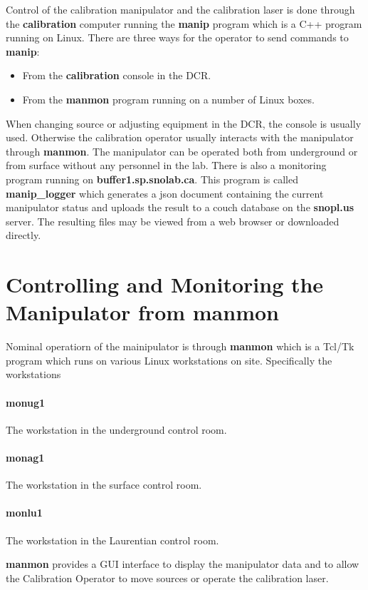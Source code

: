 
Control of the calibration manipulator and the calibration laser is
done through the \textbf{calibration} computer running the \textbf{manip}
program which is a C++ program running on Linux. There are three ways
for the operator to send commands to \textbf{manip}:
\begin{itemize}
\item From the \textbf{calibration} console in the DCR.
\item From the \textbf{manmon} program running on a number of Linux
  boxes.
\end{itemize}
When changing source or adjusting equipment in the DCR, the console is
usually used. Otherwise the calibration operator usually interacts
with the manipulator through \textbf{manmon}. The manipulator can be
operated both from underground or from surface without any personnel
in the lab. There is also a monitoring program running on
\textbf{buffer1.sp.snolab.ca}. This program is called
\textbf{manip\_logger} which generates a json document containing the
current manipulator status and uploads the result to a couch database
on the \textbf{snopl.us} server. The resulting files may be viewed
from a web browser or downloaded directly.

\section{Controlling and Monitoring the Manipulator from manmon}
Nominal operatiorn of the mainipulator is through \textbf{manmon}
which is a Tcl/Tk program which runs on various Linux workstations on
site. Specifically the workstations

\paragraph{monug1} The workstation in the underground control room.
\paragraph{monag1} The workstation in the surface control room.
\paragraph{monlu1} The workstation in the Laurentian control room.

\textbf{manmon} provides a GUI interface to display the manipulator
data and to allow the Calibration Operator to move sources or operate
the calibration laser.

